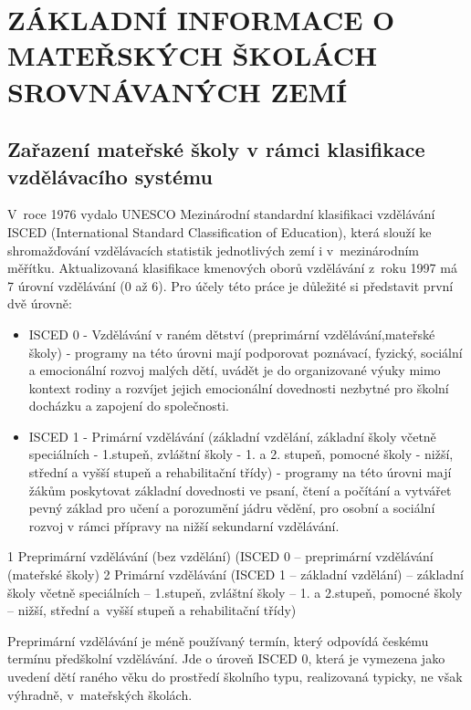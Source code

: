 	
\chapter{ZÁKLADNÍ INFORMACE O MATEŘSKÝCH ŠKOLÁCH SROVNÁVANÝCH ZEMÍ}

	\section{Zařazení mateřské školy v rámci klasifikace vzdělávacího systému}

		V roce 1976 vydalo UNESCO Mezinárodní standardní klasifikaci vzdělávání ISCED (International Standard Classification of Education), která slouží ke shromažďování vzdělávacích statistik jednotlivých zemí i v mezinárodním měřítku. Aktualizovaná klasifikace kmenových oborů vzdělávání z roku 1997 má 7 úrovní vzdělávání (0 až 6).
		Pro účely této práce je důležité si představit první dvě úrovně:
\begin{itemize}
\item []ISCED 0 - Vzdělávání v raném dětství (preprimární vzdělávání,mateřské školy) - programy na této úrovni mají podporovat poznávací, fyzický, sociální a emocionální rozvoj malých dětí, uvádět je do organizované výuky mimo kontext rodiny a rozvíjet jejich emocionální dovednosti nezbytné pro školní docházku a zapojení do společnosti. 
\item []ISCED 1 - Primární vzdělávání (základní vzdělání, základní školy včetně speciálních - 1.stupeň, zvláštní školy - 1. a 2. stupeň, pomocné školy - nižší, střední a vyšší stupeň a rehabilitační třídy) - programy na této úrovni mají žákům poskytovat základní dovednosti ve psaní, čtení a počítání a vytvářet pevný základ pro učení a porozumění jádru vědění, pro osobní a sociální rozvoj v rámci přípravy na nižší sekundarní vzdělávání. \citet{ISCED}
\end{itemize}


		1   Preprimární vzdělávání (bez vzdělání) (ISCED 0 – preprimární vzdělávání (mateřské školy)
		2  Primární vzdělávání (ISCED 1 – základní vzdělání) – základní školy včetně speciálních – 1.stupeň, zvláštní školy – 1. a 2.stupeň, pomocné školy – nižší, střední a vyšší stupeň a rehabilitační třídy)

		Preprimární vzdělávání je méně používaný termín, který odpovídá českému termínu předškolní vzdělávání. Jde o úroveň ISCED 0, která je vymezena jako uvedení dětí raného věku do prostředí školního typu, realizovaná typicky, ne však výhradně, v mateřských školách.

